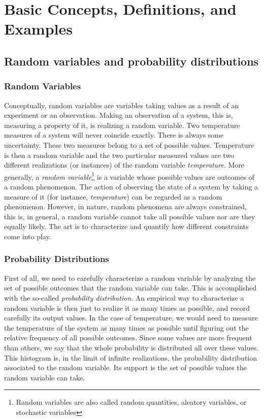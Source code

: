 \section{Basic Concepts, Definitions, and Examples}

\subsection{Random variables and probability distributions}

\subsubsection{Random Variables}
Conceptually, random variables are variables taking values as a result of an experiment or an observation. Making an observation of a system, this is, measuring a property of it, is realizing a random variable. Two temperature measures of a system will never coincide exactly. There is always some uncertainty. These two measures belong to a set of possible values. Temperature is then a random variable and the two particular measured values are two different realizations (or instances) of the random variable {\it temperature}. More generally, a {\it random variable}\footnote{Random variables are also called random quantities, aleatory variables, or stochastic variables} is a variable whose possible values are outcomes of a random phenomenon. The action of observing the state of a system by taking a measure of it (for instance, {\it temperature}) can be regarded as a random phenomenon. However, in nature, random phenomena are always constrained, this is, in general, a random variable cannot take all possible values nor are they equally likely. The art is to characterize and quantify how different constraints come into play.  
\smallskip

\subsubsection{Probability Distributions}
First of all, we need to carefully characterize a random variable by analyzing the set of possible outcomes that the random variable can take. This is accomplished with the so-called {\it probability distribution}. An empirical way to characterize a random variable is then just to realize it as many times as possible, and record carefully its output values. In the case of temperature, we would need to measure the temperature of the system as many times as possible until figuring out the relative frequency of all possible outcomes. Since some values are more frequent than others, we say that the whole probability is distributed all over these values. This histogram is, in the limit of infinite realizations, the probability distribution associated to the random variable. Its support is the set of possible values the random variable can take. 
\smallskip

